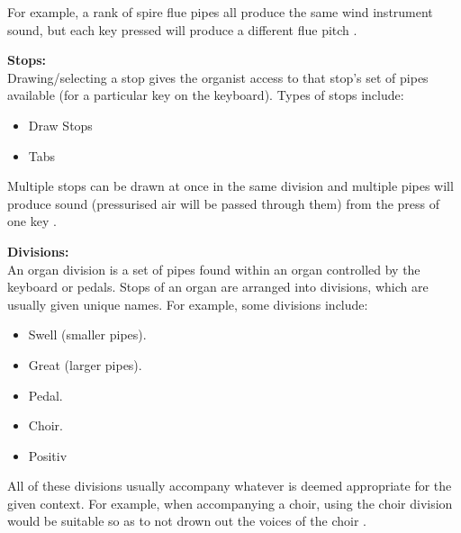 For example, a rank of spire flue pipes all produce the same wind instrument sound, but each key pressed will produce a different flue pitch \cite{organvideo}. 

\noindent \textbf{Stops:}
\\ \hspace*{0.5cm}Drawing/selecting a stop gives the organist access to that stop's set of pipes available (for a particular key on the keyboard). Types of stops include:
\vspace{-0.15cm}
\begin{itemize}
    \itemsep0em 
\item Draw Stops
\vspace{-0.1cm}
\item Tabs
\end{itemize}
\vspace{-0.15cm}

Multiple stops can be drawn at once in the same division and multiple pipes will produce sound (pressurised air will be passed through them) from the press of one key \cite{organvideo}.

\noindent \textbf{Divisions:}
\\ \hspace*{0.5cm} An organ division is a set of pipes found within an organ controlled by the keyboard or pedals. Stops of an organ are arranged into divisions, which are usually given unique names. For example, some divisions include:

\vspace{-0.15cm}
\begin{itemize}
    \itemsep0em 
\item Swell (smaller pipes).
\vspace{-0.1cm}
\item Great (larger pipes).
\vspace{-0.1cm}
\item Pedal.
\vspace{-0.1cm}
\item Choir.
\vspace{-0.1cm}
\item Positiv
\end{itemize}
\vspace{-0.15cm}

All of these divisions usually accompany whatever is deemed appropriate for the given context. For example, when accompanying a choir, using the choir division would be suitable so as to not drown out the voices of the choir \cite{organvideo}. 

